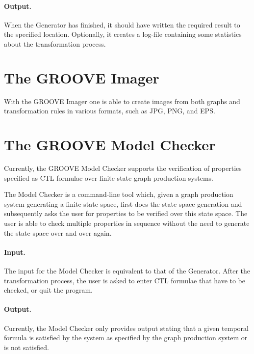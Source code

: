 \paragraph{Output.} When the Generator has finished, it should have written the required result to the specified location. Optionally, it creates a log-file containing some statistics about the transformation process.


\section{The GROOVE Imager}

With the GROOVE Imager one is able to create images from both graphs and transformation rules in various formats, such as JPG, PNG, and EPS.

\section{The GROOVE Model Checker}

Currently, the GROOVE Model Checker supports the verification of properties specified as CTL formulae over finite state graph production systems.

The Model Checker is a command-line tool which, given a graph production system generating a finite state space, first does the state space generation and subsequently asks the user for properties to be verified over this state space. The user is able to check multiple properties in sequence without the need to generate the state space over and over again.

\paragraph{Input.} The input for the Model Checker is equivalent to that of the Generator. After the transformation process, the user is asked to enter CTL formulae that have to be checked, or quit the program.

\paragraph{Output.} Currently, the Model Checker only provides output stating that a given temporal formula is satisfied by the system as specified by the graph production system or is not satisfied.